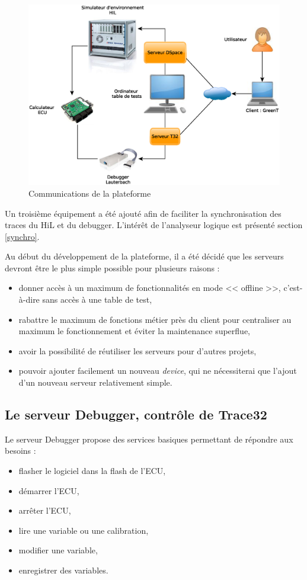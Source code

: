 \begin{figure}[H]
	\centering
	\includegraphics[width=11.5cm]{contents/images/network.eps}
	\caption{Communications de la plateforme}
	\label{fig:wbgt}
\end{figure}

\begin{remarque}
Un troisième équipement a été ajouté afin de faciliter la synchronisation des traces du HiL et du debugger. L'intérêt de l'analyseur logique est présenté section \ref{synchro}.
\end{remarque}


Au début du développement de la plateforme, il a été décidé que les serveurs devront être le plus simple possible pour plusieurs raisons
: 
\begin{itemize}
	\item donner accès à un maximum de fonctionnalités en mode << offline >>, c'est-à-dire sans accès à une table de test,
	\item rabattre le maximum de fonctions métier près du client pour centraliser au maximum le fonctionnement et éviter la maintenance superflue,
	\item avoir la possibilité de réutiliser les serveurs pour d'autres projets,
	\item pouvoir ajouter facilement un nouveau \textit{device}, qui ne nécessiterai que l'ajout d'un nouveau serveur relativement simple.
\end{itemize}

\subsection{Le serveur Debugger, contrôle de Trace32}\label{T32server}
Le serveur Debugger propose des services basiques permettant de répondre aux besoins :
\begin{itemize}
	\item flasher le logiciel dans la flash de l'ECU,
	\item démarrer l'ECU,
	\item arrêter l'ECU,
	\item lire une variable ou une calibration,
	\item modifier une variable,
	\item enregistrer des variables.
\end{itemize}~

